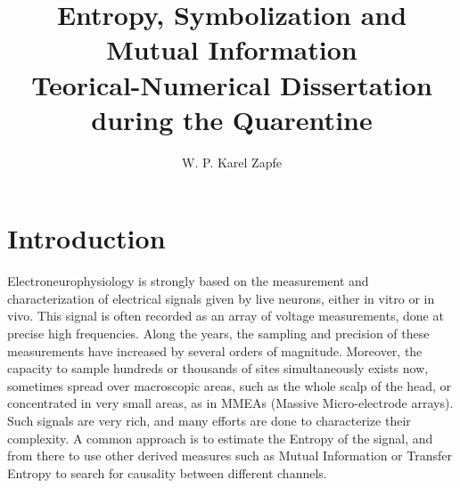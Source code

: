 \documentclass[10pt]{article}
\title{Entropy, Symbolization and Mutual Information \\
Teorical-Numerical Dissertation during the Quarentine}
\author{ W. P. Karel Zapfe}
\begin{document}
\maketitle

\section{Introduction}

Electroneurophysiology is strongly based on the measurement and characterization of electrical signals given by live neurons, either in vitro or in vivo. This signal is often recorded as an array of voltage measurements, done at precise high frequencies. Along the years, the sampling and precision of these measurements have increased by several orders of magnitude. Moreover, the capacity to sample hundreds or thousands of sites simultaneously exists now, sometimes spread over macroscopic areas, such as the whole scalp of the head, or concentrated in very small areas, as in MMEAs (Massive Micro-electrode arrays). Such signals are very rich, and many efforts are done to characterize their complexity. A common approach is to estimate the Entropy of the signal, and from there to use other derived measures such as Mutual Information or Transfer Entropy to search for causality between different channels.
\end{document}

